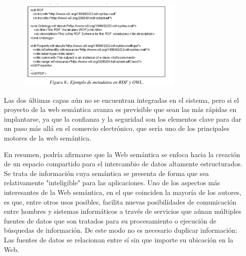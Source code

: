 \begin{figure}[H]
	\centering
	\includegraphics[height=4.5cm]{imagenes/capitulo3/26} %
	\caption{}
	\label{}
\end{figure}

Las dos últimas capas aún no se encuentran integradas en el sistema, pero si el proyecto de la web semántica avanza es previsible que sean las más rápidas en implantarse, ya que la confianza y la seguridad son los elementos clave para dar un paso más allá en el comercio electrónico, que sería uno de los principales motores de la web semántica.


En resumen, podría afirmarse que la Web semántica se enfoca hacia la creación de un espacio compartido para el intercambio de datos altamente estructurados. Se trata de información cuya semántica se presenta de forma que sea relativamente "inteligible" para las aplicaciones. Uno de los aspectos más interesantes de la Web semántica, en el que coinciden la mayoría de los autores, es que, entre otros usos posibles, facilita nuevas posibilidades de comunicación entre hombres y sistemas informáticos a través de servicios que aúnan múltiples fuentes de datos que son tratados para su procesamiento o ejecución de búsquedas de información. De este modo no es necesario duplicar información: Las fuentes de datos se relacionan entre sí sin que importe su ubicación en la Web.




